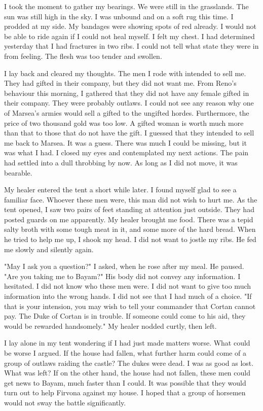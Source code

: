 \documentclass{article}
\begin{document}
I took the moment to gather my bearings. We were still in the grasslands. The sun was still high in the sky. I was unbound and on a soft rug this time. I prodded at my side. My bandages were showing spots of red already. I would not be able to ride again if I could not heal myself. I felt my chest. I had determined yesterday that I had fractures in two ribs. I could not tell what state they were in from feeling. The flesh was too tender and swollen. 

I lay back and cleared my thoughts. The men I rode with intended to sell me. They had gifted in their company, but they did not want me. From Reno's behaviour this morning, I gathered that they did not have any female gifted in their company. They were probably outlaws. I could not see any reason why one of Marsea's armies would sell a gifted to the ungifted hordes. Furthermore, the price of two thousand gold was too low. A gifted woman is worth much more than that to those that do not have the gift. I guessed that they intended to sell me back to Marsea. It was a guess. There was much I could be missing, but it was what I had. I closed my eyes and contemplated my next actions. The pain had settled into a dull throbbing by now. As long as I did not move, it was bearable. 

My healer entered the tent a short while later. I found myself glad to see a familiar face. Whoever these men were, this man did not wish to hurt me. As the tent opened, I saw two pairs of feet standing at attention just outside. They had posted guards on me apparently. My healer brought me food. There was a tepid salty broth with some tough meat in it, and some more of the hard bread. When he tried to help me up, I shook my head. I did not want to jostle my ribs. He fed me slowly and silently again.

"May I ask you a question?" I asked, when he rose after my meal. He paused. "Are you taking me to Bayam?" His body did not convey any information. I hesitated. I did not know who these men were. I did not want to give too much information into the wrong hands. I did not see that I had much of a choice. "If that is your intension, you may wish to tell your commander that Cortan cannot pay. The Duke of Cortan is in trouble. If someone could come to his aid, they would be rewarded handsomely." My healer nodded curtly, then left.

I lay alone in my tent wondering if I had just made matters worse. What could be worse I argued. If the house had fallen, what further harm could come of a group of outlaws raiding the castle? The dukes were dead. I was as good as lost. What was left? If on the other hand, the house had not fallen, these men could get news to Bayam, much faster than I could. It was possible that they would turn out to help Firvona against my house. I hoped that a group of horsemen would not sway the battle significantly. 
\end{document}
